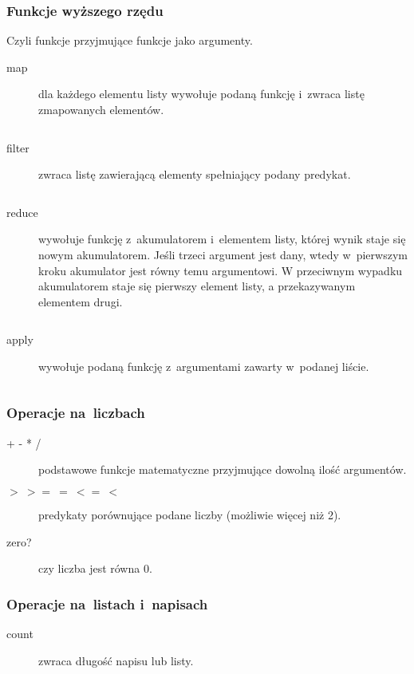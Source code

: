 \documentclass[a4paper,11pt]{article}
\newcommand{\clj}[1]{\inputminted[fontsize=\footnotesize]{clojure}{code/#1.clj}}
\begin{document}
\subsubsection{Funkcje wyższego rzędu}

Czyli funkcje przyjmujące funkcje jako argumenty.

\begin{description}
\item[map] dla każdego elementu listy wywołuje podaną funkcję i~zwraca listę
  zmapowanych elementów.
  \clj{map}

\item[filter] zwraca listę zawierającą elementy spełniający podany predykat.
  \clj{filter}

\item[reduce] wywołuje funkcję z~akumulatorem i~elementem listy, której wynik
  staje się nowym akumulatorem. Jeśli trzeci argument jest dany, wtedy
  w~pierwszym kroku akumulator jest równy temu argumentowi. W przeciwnym
  wypadku akumulatorem staje się pierwszy element listy, a przekazywanym
  elementem drugi.
  \clj{reduce}

\item[apply] wywołuje podaną funkcję z~argumentami zawarty w~podanej liście.
  \clj{apply}

\end{description}

\subsubsection{Operacje na~liczbach}

\begin{description}
\item[+ - * /] podstawowe funkcje matematyczne przyjmujące dowolną ilość
  argumentów.

\item[$> \ >= \ = \ <= \ <$] predykaty porównujące podane liczby (możliwie
  więcej niż 2).

\item[zero?] czy liczba jest równa 0.
\end{description}

\subsubsection{Operacje na~listach i~napisach}

\begin{description}
\item[count] zwraca długość napisu lub listy.
\end{description}
\end{document}
